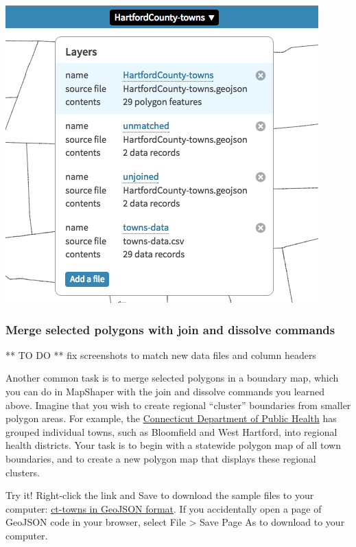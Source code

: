 \documentclass[
  english,
]{book}
\begin{document}
\includegraphics{images/09-transform/mapshaper-unmatched-unjoined.png}

\hypertarget{merge-selected-polygons-with-join-and-dissolve-commands}{%
\subsubsection*{Merge selected polygons with join and dissolve commands}\label{merge-selected-polygons-with-join-and-dissolve-commands}}

** TO DO ** fix screenshots to match new data files and column headers

Another common task is to merge selected polygons in a boundary map, which you can do in MapShaper with the join and dissolve commands you learned above. Imagine that you wish to create regional ``cluster'' boundaries from smaller polygon areas. For example, the \href{http://www.ct.gov/dph/cwp/view.asp?a=3123\&q=397740}{Connecticut Department of Public Health} has grouped individual towns, such as Bloomfield and West Hartford, into regional health districts. Your task is to begin with a statewide polygon map of all town boundaries, and to create a new polygon map that displays these regional clusters.

Try it! Right-click the link and Save to download the sample files to your computer: \href{data/ct-towns.geojson}{ct-towns in GeoJSON format}. If you accidentally open a page of GeoJSON code in your browser, select File \textgreater{} Save Page As to download to your computer.
\end{document}

